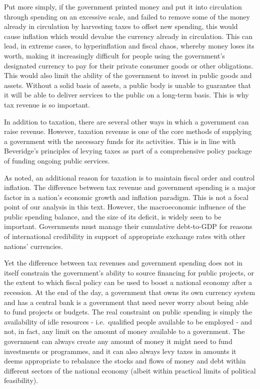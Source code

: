 \documentclass[]{tufte-handout}
\begin{document}
Put more simply, if the government printed money and put it into
circulation through spending on an excessive scale, and failed to remove
some of the money already in circulation by harvesting taxes to offset
new spending, this would cause inflation which would devalue the
currency already in circulation. This can lead, in extreme cases, to
hyperinflation and fiscal chaos, whereby money loses its worth, making
it increasingly difficult for people using the government's designated
currency to pay for their private consumer goods or other obligations.
This would also limit the ability of the government to invest in public
goods and assets. Without a solid basis of assets, a public body is
unable to guarantee that it will be able to deliver services to the
public on a long-term basis. This is why tax revenue is so important.

In addition to taxation, there are several other ways in which a
government can raise revenue. However, taxation revenue is one of the
core methods of supplying a government with the necessary funds for its
activities. This is in line with Beveridge's principles of levying taxes
as part of a comprehensive policy package of funding ongoing public
services.

As noted, an additional reason for taxation is to maintain fiscal order
and control inflation. The difference between tax revenue and government
spending is a major factor in a nation's economic growth and inflation
paradigm. This is not a focal point of our analysis in this text.
However, the macroeconomic influence of the public spending balance, and
the size of its deficit, is widely seen to be important. Governments
must manage their cumulative debt-to-GDP for reasons of international
credibility in support of appropriate exchange rates with other nations'
currencies.

Yet the difference between tax revenues and government spending does not
in itself constrain the government's ability to source financing for
public projects, or the extent to which fiscal policy can be used to
boost a national economy after a recession. At the end of the day, a
government that owns its own currency system and has a central bank is a
government that need never worry about being able to fund projects or
budgets. The real constraint on public spending is simply the
availability of idle resources - i.e.~qualified people available to be
employed - and not, in fact, any limit on the amount of money available
to a government. The government can always create any amount of money it
might need to fund investments or programmes, and it can also always
levy taxes in amounts it deems appropriate to rebalance the stocks and
flows of money and debt within different sectors of the national economy
(albeit within practical limits of political feasibility).
\end{document}
